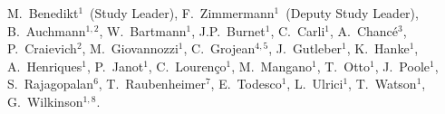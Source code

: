 M.~Benedikt$^{{1}}$~(Study Leader),
F.~Zimmermann$^{{1}}$~(Deputy Study Leader),
B.~Auchmann$^{{1, 2}}$,
W.~Bartmann$^{{1}}$,
J.P.~Burnet$^{{1}}$,
C.~Carli$^{{1}}$,
A.~Chanc{\'e}$^{{3}}$,
P.~Craievich$^{{2}}$,
M.~Giovannozzi$^{{1}}$,
C.~Grojean$^{{4, 5}}$,
J.~Gutleber$^{{1}}$,
K.~Hanke$^{{1}}$,
A.~Henriques$^{{1}}$,
P.~Janot$^{{1}}$,
C.~Louren{\c c}o$^{{1}}$,
M.~Mangano$^{{1}}$,
T.~Otto$^{{1}}$,
J.~Poole$^{{1}}$,
S.~Rajagopalan$^{{6}}$,
T.~Raubenheimer$^{{7}}$,
E.~Todesco$^{{1}}$,
L.~Ulrici$^{{1}}$,
T.~Watson$^{{1}}$,
G.~Wilkinson$^{{1,8}}$.